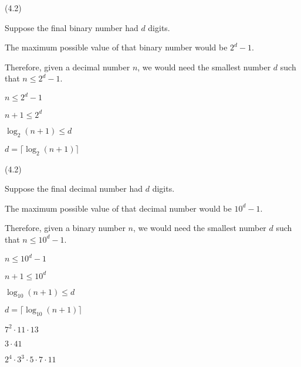 \documentclass{exam}
\begin{document}
\begin{questions}
\begin{subparts}
\end{subparts}

 (4.2)

\begin{center}
Suppose the final binary number had \(d\) digits.

The maximum possible value of that binary number would be \(2^d - 1\).

Therefore, given a decimal number \(n\), we would need the smallest number \(d\) such that \(n \leq 2^d - 1\).

\(n \leq 2^d - 1\)

\(n + 1 \leq 2^d\)

\(\log_2(n+1) \leq d\)

\(d = \lceil \log_2(n+1) \rceil\)

\end{center}


 (4.2)

\begin{center}
Suppose the final decimal number had \(d\) digits.

The maximum possible value of that decimal number would be \(10^d - 1\).

Therefore, given a binary number \(n\), we would need the smallest number \(d\) such that \(n \leq 10^d - 1\).

\(n \leq 10^d - 1\)

\(n + 1 \leq 10^d\)

\(\log_{10}(n+1) \leq d\)

\(d = \lceil \log_{10}(n+1) \rceil\)

\end{center}

\begin{subparts}

\begin{center} \( 7^2 \cdot 11 \cdot 13 \) \end{center}


\begin{center} \( 3 \cdot 41 \) \end{center}


\begin{center} \( 2^4 \cdot 3^3 \cdot 5 \cdot 7 \cdot 11 \) \end{center}


\end{subparts}
\end{questions}
\end{document}
